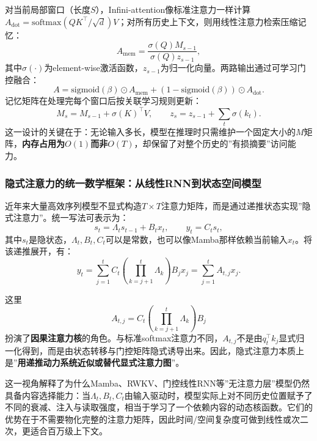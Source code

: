 \documentclass[12pt,a4paper]{article}
\begin{document}
对当前局部窗口（长度$S$），Infini-attention像标准注意力一样计算$A_{\text{dot}} = \text{softmax}(QK^\top/\sqrt{d})V$；对所有历史上下文，则用线性注意力检索压缩记忆：
\begin{equation}
A_{\text{mem}} = \frac{\sigma(Q) M_{s-1}}{\sigma(Q) z_{s-1}},
\end{equation}
其中$\sigma(\cdot)$为element-wise激活函数，$z_{s-1}$为归一化向量。两路输出通过可学习门控融合：
\begin{equation}
A = \text{sigmoid}(\beta) \odot A_{\text{mem}} + (1 - \text{sigmoid}(\beta)) \odot A_{\text{dot}}.
\end{equation}
记忆矩阵在处理完每个窗口后按关联学习规则更新：
\begin{equation}
M_s = M_{s-1} + \sigma(K)^\top V, \qquad z_s = z_{s-1} + \sum_t \sigma(k_t).
\end{equation}
这一设计的关键在于：无论输入多长，模型在推理时只需维护一个固定大小的$M$矩阵，\textbf{内存占用为$O(1)$而非$O(T)$}，却保留了对整个历史的”有损摘要”访问能力。

\subsubsection{隐式注意力的统一数学框架：从线性RNN到状态空间模型}
\label{sec:implicit-attention}

近年来大量高效序列模型不显式构造$T \times T$注意力矩阵，而是通过递推状态实现”隐式注意力”。统一写法可表示为：
\begin{equation}
s_t = \Lambda_t s_{t-1} + B_t x_t,\qquad y_t = C_t s_t,
\end{equation}
其中$s_t$是隐状态，$\Lambda_t, B_t, C_t$可以是常数，也可以像Mamba那样依赖当前输入$x_t$。将该递推展开，有：
\begin{equation}
y_t = \sum_{j=1}^{t} C_t \left(\prod_{k=j+1}^{t} \Lambda_k\right) B_j x_j
= \sum_{j=1}^{t} A_{t,j} x_j.
\end{equation}

这里
\begin{equation}
A_{t,j} = C_t \left(\prod_{k=j+1}^{t} \Lambda_k\right) B_j
\end{equation}
扮演了\textbf{因果注意力核}的角色。与标准softmax注意力不同，$A_{t,j}$不是由$q_t^\top k_j$显式归一化得到，而是由状态转移与门控矩阵隐式诱导出来。因此，隐式注意力本质上是”\textbf{用递推动力系统近似或替代显式注意力图}”。

这一视角解释了为什么Mamba、RWKV、门控线性RNN等”无注意力层”模型仍然具备内容选择能力：当$\Lambda_t, B_t, C_t$由输入驱动时，模型实际上对不同历史位置赋予了不同的衰减、注入与读取强度，相当于学习了一个依赖内容的动态核函数。它们的优势在于不需要物化完整的注意力矩阵，因此时间/空间复杂度可做到线性或次二次，更适合百万级上下文。
\end{document}
